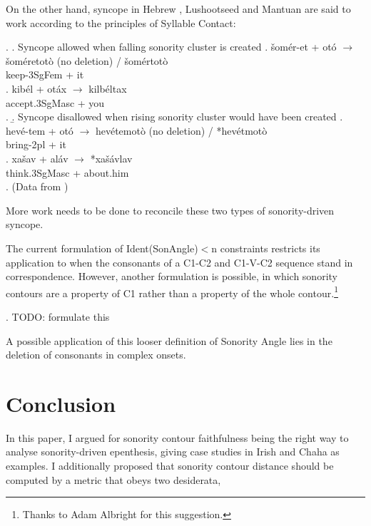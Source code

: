 \documentclass[12pt]{article}
\begin{document}
On the other hand, syncope in Hebrew \citep{landau.1997}, Lushootseed \citep{urbanczyk.1996} and Mantuan \citep{miglio.1998} are said to work according to the principles of Syllable Contact:

\ex. \a. Syncope allowed when falling sonority cluster is created
     \ag. \v{s}om\'er-et + ot\'o $\rightarrow$ \v{s}om\'eretot\`o (no deletion) / \v{s}om\'ertot\`o \\
          keep-3SgFem + it \\
     \bg. kib\'el + ot\'ax $\rightarrow$ kilb\'eltax \\
          accept.3SgMasc + you \\
     \z.
     \b. Syncope disallowed when rising sonority cluster would have been created
     \ag. hev\'e-tem + ot\'o $\rightarrow$ hev\'etemot\`o (no deletion) / *hev\'etmot\`o \\
          bring-2pl + it \\
     \bg. xa\v{s}av + al\'av $\rightarrow$ *xa\v{s}\'avlav \\
          think.3SgMasc + about.him \\
     \z.
     (Data from \citep{landau.1997})

More work needs to be done to reconcile these two types of sonority-driven syncope.

\bigskip

 The current formulation of {\sc Ident(SonAngle)}$<$n constraints restricts its application to when the consonants of a C1-C2 and C1-V-C2 sequence stand in correspondence. However, another formulation is possible, in which sonority contours are a property of C1 rather than a property of the whole contour.\footnote{Thanks to Adam Albright for this suggestion.}

\ex. TODO: formulate this

A possible application of this looser definition of {\sc Sonority Angle} lies in the deletion of consonants in complex onsets.



\section{Conclusion} \label{conclusion}

In this paper, I argued for sonority contour faithfulness being the right way to analyse sonority-driven epenthesis, giving case studies in Irish and Chaha as examples. I additionally proposed that sonority contour distance should be computed by a metric that obeys two desiderata, %
\end{document}
